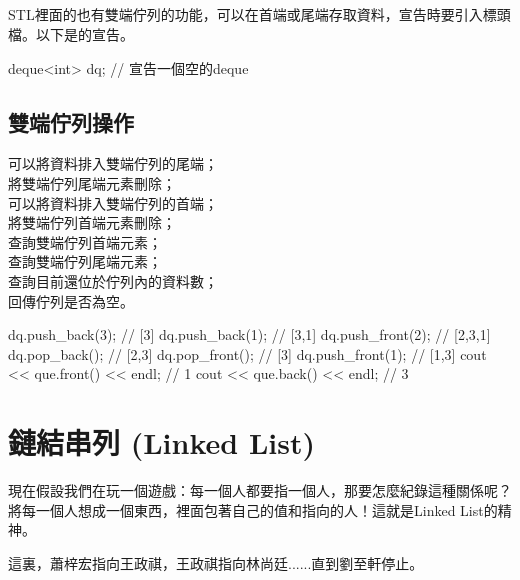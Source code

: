 \documentclass[main.tex]{subfiles}
\begin{document}
\subsection{}
STL裡面的也有雙端佇列的功能，可以在首端或尾端存取資料，宣告時要引入標頭檔。以下是的宣告。
\begin{C++}
deque<int> dq; // 宣告一個空的deque
\end{C++}
\subsection{雙端佇列操作}
 可以將資料排入雙端佇列的尾端；\\
\indent{} 將雙端佇列尾端元素刪除；\\
\indent{} 可以將資料排入雙端佇列的首端；\\
\indent{} 將雙端佇列首端元素刪除；\\
\indent{} 查詢雙端佇列首端元素；\\
\indent{} 查詢雙端佇列尾端元素；\\
\indent{} 查詢目前還位於佇列內的資料數；\\
\indent{} 回傳佇列是否為空。
\begin{C++}
dq.push_back(3); // [3]
dq.push_back(1); // [3,1]
dq.push_front(2); // [2,3,1]
dq.pop_back(); // [2,3]
dq.pop_front(); // [3]
dq.push_front(1); // [1,3]
cout << que.front() << endl; // 1
cout << que.back() << endl; // 3
\end{C++}

			
\section{鏈結串列 (Linked List)}
現在假設我們在玩一個遊戲：每一個人都要指一個人，那要怎麼紀錄這種關係呢？將每一個人想成一個東西，裡面包著自己的值和指向的人！這就是Linked List的精神。
\begin{center}
\end{center}
 這裏，蕭梓宏指向王政祺，王政祺指向林尚廷......直到劉至軒停止。
\end{document}
